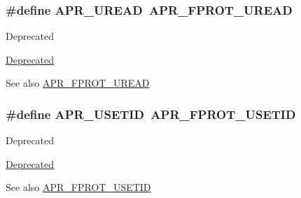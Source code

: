 \subsubsection[{\texorpdfstring{A\+P\+R\+\_\+\+U\+R\+E\+AD}{APR_UREAD}}]{\setlength{\rightskip}{0pt plus 5cm}\#define A\+P\+R\+\_\+\+U\+R\+E\+AD~{\bf A\+P\+R\+\_\+\+F\+P\+R\+O\+T\+\_\+\+U\+R\+E\+AD}}\hypertarget{group__apr__file__permissions_ga51dc87ecd94c98e97694e68d5d9620a0}{}\label{group__apr__file__permissions_ga51dc87ecd94c98e97694e68d5d9620a0}
\begin{DoxyRefDesc}{Deprecated}
\item[\hyperlink{deprecated__deprecated000011}{Deprecated}]\end{DoxyRefDesc}
\begin{DoxySeeAlso}{See also}
\hyperlink{group__apr__file__permissions_gaab6c4c2e7b95f4345c248c27b3f1a655}{A\+P\+R\+\_\+\+F\+P\+R\+O\+T\+\_\+\+U\+R\+E\+AD} 
\end{DoxySeeAlso}
\subsubsection[{\texorpdfstring{A\+P\+R\+\_\+\+U\+S\+E\+T\+ID}{APR_USETID}}]{\setlength{\rightskip}{0pt plus 5cm}\#define A\+P\+R\+\_\+\+U\+S\+E\+T\+ID~{\bf A\+P\+R\+\_\+\+F\+P\+R\+O\+T\+\_\+\+U\+S\+E\+T\+ID}}\hypertarget{group__apr__file__permissions_gafae6b531c08999345536cae5654d0d03}{}\label{group__apr__file__permissions_gafae6b531c08999345536cae5654d0d03}
\begin{DoxyRefDesc}{Deprecated}
\item[\hyperlink{deprecated__deprecated000010}{Deprecated}]\end{DoxyRefDesc}
\begin{DoxySeeAlso}{See also}
\hyperlink{group__apr__file__permissions_ga67caebf5bbe4f3f4b6252a75e5ce066f}{A\+P\+R\+\_\+\+F\+P\+R\+O\+T\+\_\+\+U\+S\+E\+T\+ID} 
\end{DoxySeeAlso}
